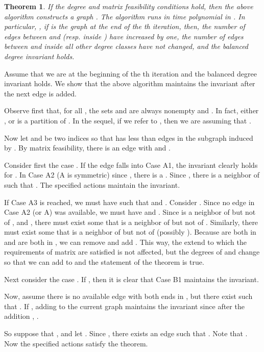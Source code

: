 \documentclass[12pt,a4paper]{article}
\theoremstyle{definition}
\theoremstyle{plain}
\newtheorem{thm}[dfn]{Theorem}
\newenvironment{prf}{\noindent {\bf Proof.}}{\begin{flushright}\vspace{-2em}\footnotesize\normalsize\end{flushright}\smallskip}
\begin{document}
\begin{thm}
\label{them:algorithm1}
If the degree and matrix feasibility conditions hold,
then the above algorithm  
constructs a graph .
The algorithm runs in time polynomial in . 
In particular, , if  is the graph at the end of the  th 
iteration, 
then, the number of edges between  and  (resp. inside ) 
have increased by one, the number of edges between and inside all other 
degree classes have not changed,
and the balanced degree invariant holds.
\end{thm}

\begin{prf}
Assume that we are at the beginning of the th iteration and 
the balanced degree invariant holds.  
We show that the above algorithm maintains 
the invariant after the next edge is added.

Observe first that, for all ,
the sets  and  are always nonempty and 
. In fact, either , 
or  is a partition of . 
In the sequel, if we refer to , then we are assuming that .

Now let  and  be two indices so that  has less 
than  edges in the subgraph induced by .  
By matrix feasibility, 
there is an edge  with  and .

Consider first the case . 
If the edge  falls into Case A1, 
the invariant clearly holds for .  
In Case A2 (A is symmetric) since , 
there is a .  
Since , there is a neighbor  of  
such that .  
The specified actions maintain the invariant.

If Case A3 is reached, we must have  such that  and . 
Consider .
Since no edge in Case A2 (or A) was available, 
we must have  and .
Since  is a neighbor of  but not of ,
and , 
there must exist some  that is a neighbor of  but not of . 
Similarly, there must exist some  that is a neighbor of  
but not of  (possibly ). 
Because  are both in  
and  are both in ,
we can remove  and add . 
This way, the extend to which the requirements of matrix 
are satisfied is not affected, 
but the degrees of  and  change
so that we can add  to  and the statement of the theorem is true.

Next consider the case . 
If , then it is clear that Case B1 maintains the invariant.

Now, assume there is no available edge with both ends in , 
but there exist  such that .
If , adding  to the current graph maintains 
the invariant since after the addition 
, .

So suppose that , and let . 
Since , there exists an edge  such that 
.  Note that . 
Now the specified actions satisfy the theorem.



\end{prf}
\end{document}
